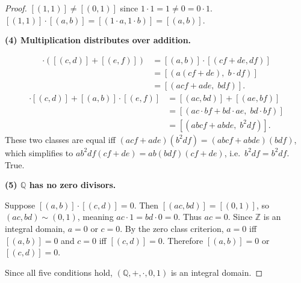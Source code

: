 \begin{proof}
$[(1,1)]\neq[(0,1)]$ since $1\cdot 1 = 1\neq 0 = 0\cdot 1$.
$[(1,1)]\cdot[(a,b)] = [(1\cdot a, 1\cdot b)] = [(a,b)]$.

\textbf{(4) Multiplication distributes over addition.}

\begin{align*}
[(a,b)]\cdot([(c,d)]+[(e,f)])
&= [(a,b)]\cdot[(cf+de,df)] \\
&= [(a(cf+de),\; b\cdot df)] \\
&= [(acf+ade,\; bdf)].
\end{align*}
\begin{align*}
[(a,b)]\cdot[(c,d)] + [(a,b)]\cdot[(e,f)]
&= [(ac,bd)] + [(ae,bf)] \\
&= [(ac\cdot bf + bd\cdot ae,\; bd\cdot bf)] \\
&= [(abcf + abde,\; b^2df)].
\end{align*}
These two classes are equal iff $(acf+ade)(b^2df) = (abcf+abde)(bdf)$,
which simplifies to $ab^2df(cf+de) = ab(bdf)(cf+de)$, i.e.\ $b^2df = b^2df$.
True.

\textbf{(5) $\mathbb{Q}$ has no zero divisors.}

Suppose $[(a,b)]\cdot[(c,d)] = 0$. Then $[(ac,bd)] = [(0,1)]$, so
$(ac,bd)\sim(0,1)$, meaning $ac\cdot 1 = bd\cdot 0 = 0$. Thus $ac = 0$.
Since $\mathbb{Z}$ is an integral domain, $a=0$ or $c=0$. By the zero class
criterion, $a=0$ iff $[(a,b)] = 0$ and $c=0$ iff $[(c,d)] = 0$.
Therefore $[(a,b)]=0$ or $[(c,d)]=0$.

Since all five conditions hold, $(\mathbb{Q},+,\cdot,0,1)$ is an integral domain.
\end{proof}

